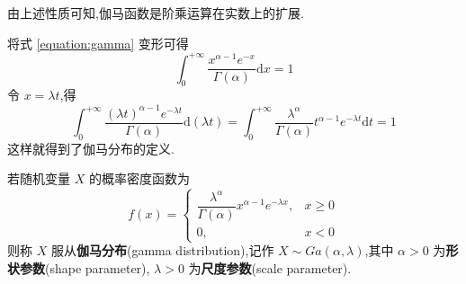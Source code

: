 \begin{note}
    \indent 由上述性质可知,伽马函数是阶乘运算在实数上的扩展.
\end{note}

将式 \eqref{equation:gamma} 变形可得
$$
\int_{0}^{+\infty} \dfrac{x^{\alpha - 1} e^{-x}}{\Gamma(\alpha)} \text{d}x = 1
$$
令 $x = \lambda t$,得
$$
\int_{0}^{+\infty} \dfrac{(\lambda t)^{\alpha - 1} e^{-\lambda t}}{\Gamma(\alpha)} \text{d}(\lambda t) = \int_{0}^{+\infty} \dfrac{\lambda^{\alpha}}{\Gamma(\alpha)} t^{\alpha - 1}  e^{-\lambda t} \text{d}t = 1
$$
这样就得到了伽马分布的定义.

\begin{definition}
    \indent 若随机变量 $X$ 的概率密度函数为
    $$
    f(x) = \begin{cases}
        \dfrac{\lambda^\alpha}{\Gamma(\alpha)} x^{\alpha - 1} e^{-\lambda x}, & x \geqslant 0 \\[0.5em]
        0, & x<0
    \end{cases}
    $$
    则称 $X$ 服从\textbf{伽马分布}(gamma distribution),记作 $X \sim Ga(\alpha,\lambda)$,其中 $\alpha > 0$ 为\textbf{形状参数}(shape parameter), $\lambda > 0$ 为\textbf{尺度参数}(scale parameter).
\end{definition}

